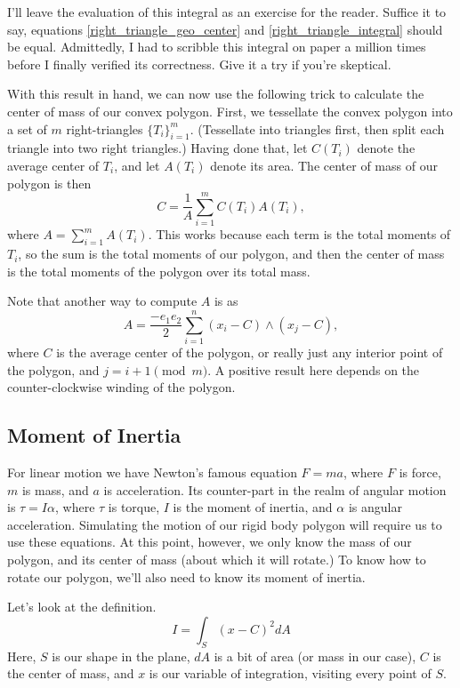 \documentclass[12pt]{article}
\begin{document}
I'll leave the evaluation of this integral as an exercise for the reader.  Suffice it to say, equations \eqref{right_triangle_geo_center}
and \eqref{right_triangle_integral} should be equal.  Admittedly, I had to scribble this integral on paper a million times before I
finally verified its correctness.  Give it a try if you're skeptical.

With this result in hand, we can now use the following trick to calculate the center of mass of our convex polygon.  First,
we tessellate the convex polygon into a set of $m$ right-triangles $\{T_i\}_{i=1}^m$.  (Tessellate into triangles first, then split each triangle into two right triangles.)
Having done that, let $C(T_i)$ denote the average center of $T_i$, and let $A(T_i)$ denote its area.  The center of mass of our polygon is then
\begin{equation}
C = \frac{1}{A}\sum_{i=1}^m C(T_i)A(T_i),
\end{equation}
where $A=\sum_{i=1}^m A(T_i)$.  This works because each term is the total moments of $T_i$, so the sum is the total moments of our polygon,
and then the center of mass is the total moments of the polygon over its total mass.

Note that another way to compute $A$ is as
\begin{equation}
A = \frac{-e_1e_2}{2}\sum_{i=1}^n (x_i-C)\wedge (x_j-C),
\end{equation}
where $C$ is the average center of the polygon, or really just any interior point of the polygon, and $j=i+1\pmod m$.
A positive result here depends on the counter-clockwise winding of the polygon.

\subsection{Moment of Inertia}

For linear motion we have Newton's famous equation $F=ma$, where $F$ is force, $m$ is mass, and $a$ is acceleration.
Its counter-part in the realm of angular motion is $\tau=I\alpha$, where $\tau$ is torque, $I$ is the moment of inertia, and $\alpha$
is angular acceleration.  Simulating the motion of our rigid body polygon will require us to use these equations.  At this point,
however, we only know the mass of our polygon, and its center of mass (about which it will rotate.)  To know how to rotate
our polygon, we'll also need to know its moment of inertia.

Let's look at the definition.
\begin{equation}
I = \int_S (x-C)^2 dA
\end{equation}
Here, $S$ is our shape in the plane, $dA$ is a bit of area (or mass in our case), $C$ is the center of mass,
and $x$ is our variable of integration, visiting every point of $S$.
\end{document}
